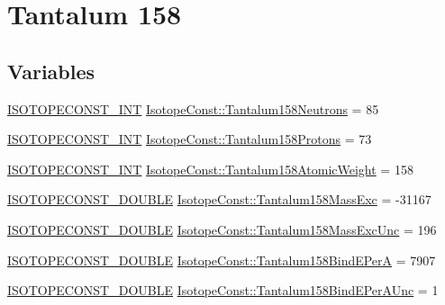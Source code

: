 \hypertarget{group___isotope_const-_tantalum-_ta158}{}\section{Tantalum 158}
\label{group___isotope_const-_tantalum-_ta158}
\subsection*{Variables}
\begin{DoxyCompactItemize}
\item 
\mbox{\hyperlink{group___isotope_const-_macros_ga5f18360b3e99483a35c32d789e62621c}{I\+S\+O\+T\+O\+P\+E\+C\+O\+N\+S\+T\+\_\+\+I\+NT}} \mbox{\hyperlink{group___isotope_const-_tantalum-_ta158_gad5dad966d251e11e4929a71a48b0e3a7}{Isotope\+Const\+::\+Tantalum158\+Neutrons}} = 85
\item 
\mbox{\hyperlink{group___isotope_const-_macros_ga5f18360b3e99483a35c32d789e62621c}{I\+S\+O\+T\+O\+P\+E\+C\+O\+N\+S\+T\+\_\+\+I\+NT}} \mbox{\hyperlink{group___isotope_const-_tantalum-_ta158_ga66fed3694e4166d6c9a9f4445b05c792}{Isotope\+Const\+::\+Tantalum158\+Protons}} = 73
\item 
\mbox{\hyperlink{group___isotope_const-_macros_ga5f18360b3e99483a35c32d789e62621c}{I\+S\+O\+T\+O\+P\+E\+C\+O\+N\+S\+T\+\_\+\+I\+NT}} \mbox{\hyperlink{group___isotope_const-_tantalum-_ta158_ga0d3fa2b04c7063a4bc721956ffd1d7d0}{Isotope\+Const\+::\+Tantalum158\+Atomic\+Weight}} = 158
\item 
\mbox{\hyperlink{group___isotope_const-_macros_ga8f45a7272ce02c0b4c65c44636ed719a}{I\+S\+O\+T\+O\+P\+E\+C\+O\+N\+S\+T\+\_\+\+D\+O\+U\+B\+LE}} \mbox{\hyperlink{group___isotope_const-_tantalum-_ta158_ga01cdfd4e406c81f427d5920b5fdc291d}{Isotope\+Const\+::\+Tantalum158\+Mass\+Exc}} = -\/31167
\item 
\mbox{\hyperlink{group___isotope_const-_macros_ga8f45a7272ce02c0b4c65c44636ed719a}{I\+S\+O\+T\+O\+P\+E\+C\+O\+N\+S\+T\+\_\+\+D\+O\+U\+B\+LE}} \mbox{\hyperlink{group___isotope_const-_tantalum-_ta158_gae23248ab937bcd84394117fc27072b7e}{Isotope\+Const\+::\+Tantalum158\+Mass\+Exc\+Unc}} = 196
\item 
\mbox{\hyperlink{group___isotope_const-_macros_ga8f45a7272ce02c0b4c65c44636ed719a}{I\+S\+O\+T\+O\+P\+E\+C\+O\+N\+S\+T\+\_\+\+D\+O\+U\+B\+LE}} \mbox{\hyperlink{group___isotope_const-_tantalum-_ta158_ga3bfabb2caded6c91fd669559a16cc520}{Isotope\+Const\+::\+Tantalum158\+Bind\+E\+PerA}} = 7907
\item 
\mbox{\hyperlink{group___isotope_const-_macros_ga8f45a7272ce02c0b4c65c44636ed719a}{I\+S\+O\+T\+O\+P\+E\+C\+O\+N\+S\+T\+\_\+\+D\+O\+U\+B\+LE}} \mbox{\hyperlink{group___isotope_const-_tantalum-_ta158_ga2afd6a2b8303d79059981d2216fcca07}{Isotope\+Const\+::\+Tantalum158\+Bind\+E\+Per\+A\+Unc}} = 1

\end{DoxyCompactItemize}
